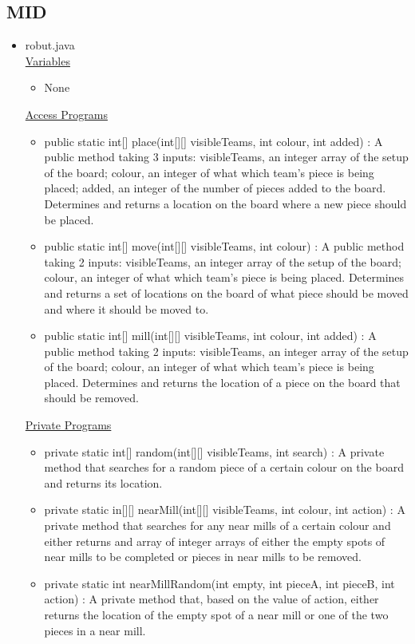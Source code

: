 \documentclass[12pt]{article}
\begin{document}
	\subsection{MID}
	\begin{itemize}
		\item robut.java \\
		\underline{Variables}
		\begin{itemize}
			\item None
		\end{itemize}
		\underline{Access Programs}
		\begin{itemize}
			\item public static int[] place(int[][] visibleTeams, int colour, int added) : A public method taking 3 inputs: visibleTeams, an integer array of the setup of the board; colour, an integer of what which team’s piece is being placed; added, an integer of the number of pieces added to the board. Determines and returns a location on the board where a new piece should be placed.
			\item public static int[] move(int[][] visibleTeams, int colour) : A public method taking 2 inputs: visibleTeams, an integer array of the setup of the board; colour, an integer of what which team’s piece is being placed. Determines and returns a set of locations on the board of what piece should be moved and where it should be moved to.
			\item public static int[] mill(int[][] visibleTeams, int colour, int added) : A public method taking 2 inputs: visibleTeams, an integer array of the setup of the board; colour, an integer of what which team’s piece is being placed. Determines and returns the location of a piece on the board that should be removed.
		\end{itemize}
		\underline{Private Programs}
		\begin{itemize}
			\item private static int[] random(int[][] visibleTeams, int search) : A private method that searches for a random piece of a certain colour on the board and returns its location.
			\item private static in[][] nearMill(int[][] visibleTeams, int colour, int action) : A private method that searches for any near mills of a certain colour and either returns and array of integer arrays of either the empty spots of near mills to be completed or pieces in near mills to be removed.
			\item private static int nearMillRandom(int empty, int pieceA, int pieceB, int action) : A private method that, based on the value of action, either returns the location of the empty spot of a near mill or one of the two pieces in a near mill.

\end{itemize}
\end{itemize}
\end{document}
